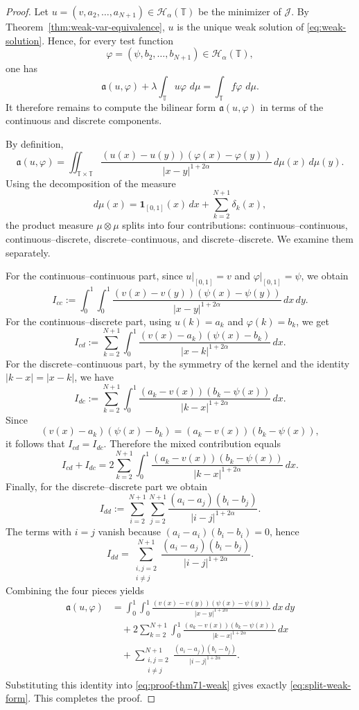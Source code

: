 \documentclass[11pt]{article}
\numberwithin{equation}{section}
\theoremstyle{definition}
\newcommand{\T}{\mathbb{T}}
\newcommand{\JJ}{\mathcal{J}}
\newcommand{\HH}{\mathcal{H}}
\newcommand{\ddmu}{\,d\mu}
\newcommand{\abs}[1]{\lvert#1\rvert}
\begin{document}
\begin{proof}
Let $u=(v,a_2,\dots,a_{N+1})\in\HH_\alpha(\T)$ be the minimizer of $\JJ$. By Theorem~\ref{thm:weak-var-equivalence}, $u$ is the unique weak solution of \eqref{eq:weak-solution}. Hence, for every test function
\[
\varphi=(\psi,b_2,\dots,b_{N+1})\in\HH_\alpha(\T),
\]
one has
\begin{equation}\label{eq:proof-thm71-weak}
\mathfrak a(u,\varphi)+\lambda\int_{\T}u\varphi\,\ddmu=\int_{\T}f\varphi\,\ddmu.
\end{equation}
It therefore remains to compute the bilinear form $\mathfrak a(u,\varphi)$ in terms of the continuous and discrete components.

By definition,
\[
\mathfrak a(u,\varphi)=\iint_{\T\times\T}
\frac{(u(x)-u(y))(\varphi(x)-\varphi(y))}{\abs{x-y}^{1+2\alpha}}\,d\mu(x)\,d\mu(y).
\]
Using the decomposition of the measure
\[
d\mu(x)=\mathbf 1_{[0,1]}(x)\,dx+\sum_{k=2}^{N+1}\delta_k(x),
\]
the product measure $\mu\otimes\mu$ splits into four contributions:
continuous--continuous, continuous--discrete, discrete--continuous, and discrete--discrete. We examine them separately.

For the continuous--continuous part, since $u|_{[0,1]}=v$ and $\varphi|_{[0,1]}=\psi$, we obtain
\[
I_{cc}:=\int_0^1\int_0^1
\frac{(v(x)-v(y))(\psi(x)-\psi(y))}{\abs{x-y}^{1+2\alpha}}\,dx\,dy.
\]
For the continuous--discrete part, using $u(k)=a_k$ and $\varphi(k)=b_k$, we get
\[
I_{cd}:=\sum_{k=2}^{N+1}\int_0^1
\frac{(v(x)-a_k)(\psi(x)-b_k)}{\abs{x-k}^{1+2\alpha}}\,dx.
\]
For the discrete--continuous part, by the symmetry of the kernel and the identity $\abs{k-x}=\abs{x-k}$, we have
\[
I_{dc}:=\sum_{k=2}^{N+1}\int_0^1
\frac{(a_k-v(x))(b_k-\psi(x))}{\abs{k-x}^{1+2\alpha}}\,dx.
\]
Since
\[
(v(x)-a_k)(\psi(x)-b_k)=(a_k-v(x))(b_k-\psi(x)),
\]
it follows that $I_{cd}=I_{dc}$. Therefore the mixed contribution equals
\[
I_{cd}+I_{dc}=2\sum_{k=2}^{N+1}\int_0^1
\frac{(a_k-v(x))(b_k-\psi(x))}{\abs{k-x}^{1+2\alpha}}\,dx.
\]
Finally, for the discrete--discrete part we obtain
\[
I_{dd}:=\sum_{i=2}^{N+1}\sum_{j=2}^{N+1}
\frac{(a_i-a_j)(b_i-b_j)}{\abs{i-j}^{1+2\alpha}}.
\]
The terms with $i=j$ vanish because $(a_i-a_i)(b_i-b_i)=0$, hence
\[
I_{dd}=\sum_{\substack{i,j=2\\ i\neq j}}^{N+1}
\frac{(a_i-a_j)(b_i-b_j)}{\abs{i-j}^{1+2\alpha}}.
\]
Combining the four pieces yields
\begin{align*}
\mathfrak a(u,\varphi)
&=\int_0^1\int_0^1
\frac{(v(x)-v(y))(\psi(x)-\psi(y))}{\abs{x-y}^{1+2\alpha}}\,dx\,dy\\
&\quad+2\sum_{k=2}^{N+1}\int_0^1
\frac{(a_k-v(x))(b_k-\psi(x))}{\abs{k-x}^{1+2\alpha}}\,dx\\
&\quad+\sum_{\substack{i,j=2\\ i\neq j}}^{N+1}
\frac{(a_i-a_j)(b_i-b_j)}{\abs{i-j}^{1+2\alpha}}.
\end{align*}
Substituting this identity into \eqref{eq:proof-thm71-weak} gives exactly \eqref{eq:split-weak-form}. This completes the proof.
\end{proof}
\end{document}
